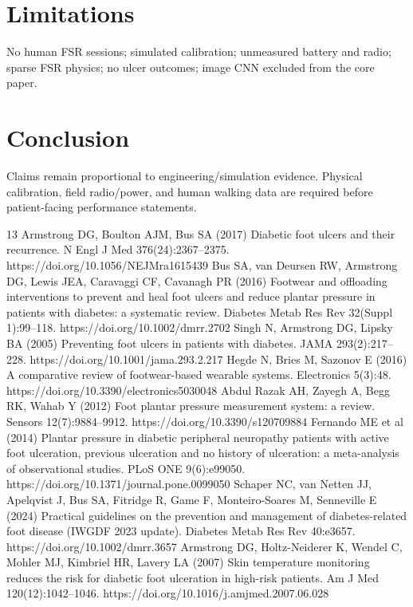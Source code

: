 \documentclass[runningheads]{llncs}
\begin{document}
\section{Limitations}
No human FSR sessions; simulated calibration; unmeasured battery and radio; sparse FSR physics; no ulcer outcomes; image CNN excluded from the core paper.

\section{Conclusion}
Claims remain proportional to engineering/simulation evidence. Physical calibration, field radio/power, and human walking data are required before patient-facing performance statements.

\begin{thebibliography}{13}
 Armstrong DG, Boulton AJM, Bus SA (2017) Diabetic foot ulcers and their recurrence. N Engl J Med 376(24):2367--2375. https://doi.org/10.1056/NEJMra1615439
 Bus SA, van Deursen RW, Armstrong DG, Lewis JEA, Caravaggi CF, Cavanagh PR (2016) Footwear and offloading interventions to prevent and heal foot ulcers and reduce plantar pressure in patients with diabetes: a systematic review. Diabetes Metab Res Rev 32(Suppl 1):99--118. https://doi.org/10.1002/dmrr.2702
 Singh N, Armstrong DG, Lipsky BA (2005) Preventing foot ulcers in patients with diabetes. JAMA 293(2):217--228. https://doi.org/10.1001/jama.293.2.217
 Hegde N, Bries M, Sazonov E (2016) A comparative review of footwear-based wearable systems. Electronics 5(3):48. https://doi.org/10.3390/electronics5030048
 Abdul Razak AH, Zayegh A, Begg RK, Wahab Y (2012) Foot plantar pressure measurement system: a review. Sensors 12(7):9884--9912. https://doi.org/10.3390/s120709884
 Fernando ME et al (2014) Plantar pressure in diabetic peripheral neuropathy patients with active foot ulceration, previous ulceration and no history of ulceration: a meta-analysis of observational studies. PLoS ONE 9(6):e99050. https://doi.org/10.1371/journal.pone.0099050
 Schaper NC, van Netten JJ, Apelqvist J, Bus SA, Fitridge R, Game F, Monteiro-Soares M, Senneville E (2024) Practical guidelines on the prevention and management of diabetes-related foot disease (IWGDF 2023 update). Diabetes Metab Res Rev 40:e3657. https://doi.org/10.1002/dmrr.3657
 Armstrong DG, Holtz-Neiderer K, Wendel C, Mohler MJ, Kimbriel HR, Lavery LA (2007) Skin temperature monitoring reduces the risk for diabetic foot ulceration in high-risk patients. Am J Med 120(12):1042--1046. https://doi.org/10.1016/j.amjmed.2007.06.028

\end{thebibliography}
\end{document}
